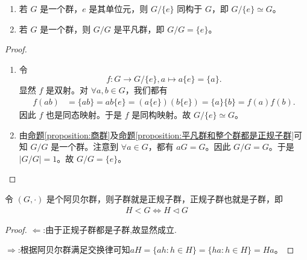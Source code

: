 \documentclass[../../main.tex]{subfiles}
\begin{document}
\begin{corollary}\label{corollary:G/{e}同构于G,G/G={e}}
\begin{enumerate}[(1)]
\item 若 $G$ 是一个群，$e$ 是其单位元，则 $G/\{e\}$ 同构于 $G$，即 $G/\{e\}\simeq G$。

\item 若 $G$ 是一个群，则 $G/G$ 是平凡群，即 $G/G = \{e\}$。
\end{enumerate}
\end{corollary}
\begin{proof}
\begin{enumerate}[(1)]
\item 令 
\[f:G\rightarrow G/\{e\}, a\mapsto a\{e\}=\{a\}.\]
显然 $f$ 是双射。对 $\forall a,b\in G$，我们都有
\begin{align*}
f(ab)&=\{ab\}=ab\{e\}=(a\{e\})(b\{e\})=\{a\}\{b\}=f(a)f(b).
\end{align*}
因此 $f$ 也是同态映射。于是 $f$ 是同构映射。故 $G/\{e\}\simeq G$。

\item 由\hyperref[proposition:商群]{命题\ref{proposition:商群}}及\hyperref[proposition:平凡群都是正规子群]{命题\ref{proposition:平凡群和整个群都是正规子群}}可知 $G/G$ 是一个群。注意到 $\forall a\in G$，都有 $aG = G$。因此 $G/G = G$。于是 $|G/G| = 1$。故 $G/G = \{e\}$。 
\end{enumerate}
\end{proof}

\begin{proposition}
令 $(G,\cdot)$ 是个阿贝尔群，则子群就是正规子群，正规子群也就是子群，即
\begin{align*}
H < G\iff H\lhd G
\end{align*}
\end{proposition}
\begin{proof}
$\Leftarrow$:由于正规子群都是子群,故显然成立.

$\Rightarrow$:根据阿贝尔群满足交换律可知$aH = \{ah:h\in H\} = \{ha:h\in H\} = Ha$。
\end{proof}
\end{document}
